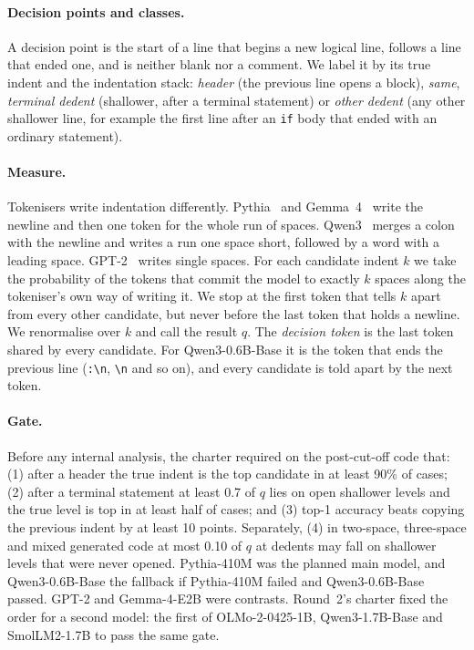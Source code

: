 \documentclass[11pt]{article}
\newcommand{\qw}{Qwen3-0.6B-Base}
\newcommand{\code}[1]{\texttt{#1}}
\begin{document}
\paragraph{Decision points and classes.} A decision point is the start of a line that begins a new logical line, follows a line that ended one, and is neither blank nor a comment. We label it by its true indent and the indentation stack: \emph{header} (the previous line opens a block), \emph{same}, \emph{terminal dedent} (shallower, after a terminal statement) or \emph{other dedent} (any other shallower line, for example the first line after an \code{if} body that ended with an ordinary statement).

\paragraph{Measure.} Tokenisers write indentation differently. Pythia~\citep{biderman2023pythia} and Gemma~4~\citep{gemma2026gemma4} write the newline and then one token for the whole run of spaces. Qwen3~\citep{qwen2025qwen3} merges a colon with the newline and writes a run one space short, followed by a word with a leading space. GPT-2~\citep{radford2019language} writes single spaces. For each candidate indent $k$ we take the probability of the tokens that commit the model to exactly $k$ spaces along the tokeniser's own way of writing it. We stop at the first token that tells $k$ apart from every other candidate, but never before the last token that holds a newline. We renormalise over $k$ and call the result $q$. The \emph{decision token} is the last token shared by every candidate. For \qw{} it is the token that ends the previous line (\code{:\textbackslash n}, \code{\textbackslash n} and so on), and every candidate is told apart by the next token.

\paragraph{Gate.} Before any internal analysis, the charter required on the post-cut-off code that: (1) after a header the true indent is the top candidate in at least 90\% of cases; (2) after a terminal statement at least 0.7 of $q$ lies on open shallower levels and the true level is top in at least half of cases; and (3) top-1 accuracy beats copying the previous indent by at least 10 points. Separately, (4) in two-space, three-space and mixed generated code at most 0.10 of $q$ at dedents may fall on shallower levels that were never opened. Pythia-410M was the planned main model, and \qw{} the fallback if Pythia-410M failed and \qw{} passed. GPT-2 and Gemma-4-E2B were contrasts. Round~2's charter fixed the order for a second model: the first of OLMo-2-0425-1B, Qwen3-1.7B-Base and SmolLM2-1.7B to pass the same gate.
\end{document}
